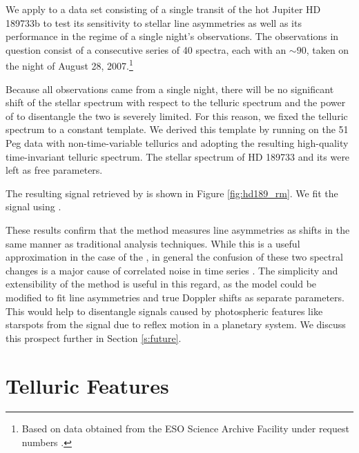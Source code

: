 \documentclass[modern]{aastex62}
\begin{document}
We apply \wobble to a data set consisting of a single transit of the hot Jupiter HD 189733b to test its sensitivity to stellar line asymmetries as well as its performance in the regime of a single night's observations.
The observations in question consist of a consecutive series of 40 spectra, each with an \SNR $\sim 90$, taken on the night of August 28, 2007.\footnote{Based on data obtained from the ESO Science Archive Facility under request numbers .}

Because all observations came from a single night, there will be no significant shift of the stellar spectrum with respect to the telluric spectrum and the power of \wobble to disentangle the two is severely limited.
For this reason, we fixed the telluric spectrum to a constant template.
We derived this template by running \wobble on the 51 Peg data with non-time-variable tellurics and adopting the resulting high-quality time-invariant telluric spectrum.
The stellar spectrum of HD 189733 and its \RVs were left as free parameters.

The resulting \RV signal retrieved by \wobble is shown in Figure \ref{fig:hd189_rm}.
We fit the signal using \starry \citep{Luger2018}. 

These results confirm that the \wobble method measures line asymmetries as \RV shifts in the same manner as traditional \RV analysis techniques.
While this is a useful approximation in the case of the \RM, in general the confusion of these two spectral changes is a major cause of correlated noise in \RV time series \citep[e.g.][]{}.
The simplicity and extensibility of the \wobble method is useful in this regard, as the model could be modified to fit line asymmetries and true Doppler shifts as separate parameters.
This would help to disentangle signals caused by photospheric features like starspots from the \RV signal due to reflex motion in a planetary system.
We discuss this prospect further in Section \ref{s:future}.


\section{Telluric Features}
\label{s:tellurics}
\end{document}
